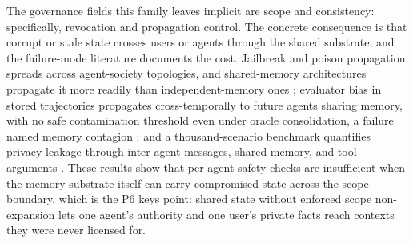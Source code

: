 The governance fields this family leaves implicit are scope and consistency: specifically, revocation and propagation control. The concrete consequence is that corrupt or stale state crosses users or agents through the shared substrate, and the failure-mode literature documents the cost. Jailbreak and poison propagation spreads across agent-society topologies, and shared-memory architectures propagate it more readily than independent-memory ones \citep{men2024troublemaker}; evaluator bias in stored trajectories propagates cross-temporally to future agents sharing memory, with no safe contamination threshold even under oracle consolidation, a failure named memory contagion \citep{liu2026memorycontagion}; and a thousand-scenario benchmark quantifies privacy leakage through inter-agent messages, shared memory, and tool arguments \citep{elyagoubi2026agentleak}. These results show that per-agent safety checks are insufficient when the memory substrate itself can carry compromised state across the scope boundary, which is the P6 keys point: shared state without enforced scope non-expansion lets one agent's authority and one user's private facts reach contexts they were never licensed for.

